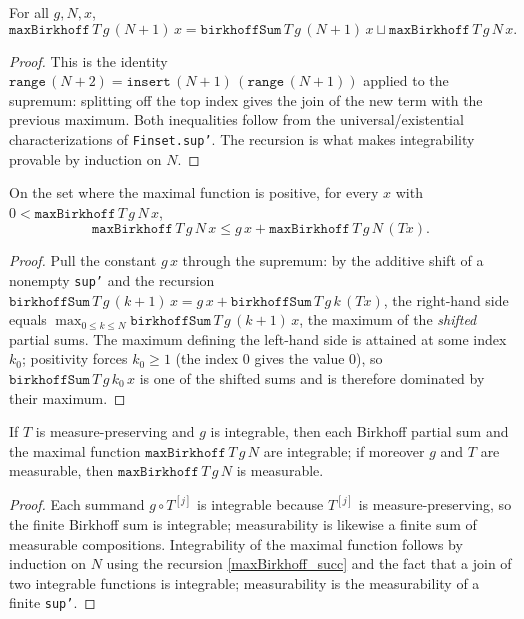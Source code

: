 \begin{lemma}\label{maxBirkhoff_succ}
  \leanok
  For all \(g, N, x\),
  \[
    \texttt{maxBirkhoff}\,T\,g\,(N+1)\,x
      = \texttt{birkhoffSum}\,T\,g\,(N+1)\,x
        \sqcup \texttt{maxBirkhoff}\,T\,g\,N\,x.
  \]
\end{lemma}
\begin{proof}\leanok
  This is the identity \(\texttt{range}\,(N+2) = \texttt{insert}\,(N+1)\,
  (\texttt{range}\,(N+1))\) applied to the supremum: splitting off the top
  index gives the join of the new term with the previous maximum. Both
  inequalities follow from the universal/existential characterizations of
  \texttt{Finset.sup'}. The recursion is what makes integrability provable by
  induction on \(N\).
\end{proof}

\begin{lemma}\label{maxBirkhoff_le_add}
  \leanok
  On the set where the maximal function is positive, for every \(x\) with
  \(0 < \texttt{maxBirkhoff}\,T\,g\,N\,x\),
  \[
    \texttt{maxBirkhoff}\,T\,g\,N\,x
      \le g\,x + \texttt{maxBirkhoff}\,T\,g\,N\,(T x).
  \]
\end{lemma}
\begin{proof}\leanok
  Pull the constant \(g\,x\) through the supremum: by the additive shift of a
  nonempty \texttt{sup'} and the recursion
  \(\texttt{birkhoffSum}\,T\,g\,(k+1)\,x = g\,x +
  \texttt{birkhoffSum}\,T\,g\,k\,(Tx)\), the right-hand side equals
  \(\max_{0 \le k \le N} \texttt{birkhoffSum}\,T\,g\,(k+1)\,x\), the maximum of
  the \emph{shifted} partial sums. The maximum defining the left-hand side is
  attained at some index \(k_0\); positivity forces \(k_0 \ge 1\) (the index
  \(0\) gives the value \(0\)), so \(\texttt{birkhoffSum}\,T\,g\,k_0\,x\) is one
  of the shifted sums and is therefore dominated by their maximum.
\end{proof}

\begin{lemma}\label{integrable_maxBirkhoff}
  \leanok
  If \(T\) is measure-preserving and \(g\) is integrable, then each Birkhoff
  partial sum and the maximal function \(\texttt{maxBirkhoff}\,T\,g\,N\) are
  integrable; if moreover \(g\) and \(T\) are measurable, then
  \(\texttt{maxBirkhoff}\,T\,g\,N\) is measurable.
\end{lemma}
\begin{proof}\leanok
  Each summand \(g \circ T^{[j]}\) is integrable because \(T^{[j]}\) is
  measure-preserving, so the finite Birkhoff sum is integrable; measurability
  is likewise a finite sum of measurable compositions. Integrability of the
  maximal function follows by induction on \(N\) using the recursion
  \cref{maxBirkhoff_succ} and the fact that a join of two integrable functions
  is integrable; measurability is the measurability of a finite \texttt{sup'}.
\end{proof}

